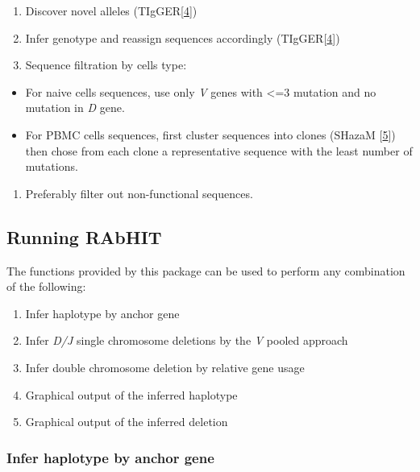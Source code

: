\documentclass[11pt,]{article}
\providecommand{\tightlist}{%
  \setlength{\itemsep}{0pt}\setlength{\parskip}{0pt}}
\begin{document}
\begin{enumerate}
\def\labelenumi{\arabic{enumi}.}
\tightlist
\item
  Discover novel alleles
  (TIgGER{[}\protect\hyperlink{ref-gadala2018identification}{4}{]})
\item
  Infer genotype and reassign sequences accordingly
  (TIgGER{[}\protect\hyperlink{ref-gadala2018identification}{4}{]})
\item
  Sequence filtration by cells type:
\end{enumerate}

\begin{itemize}
\tightlist
\item
  For naive cells sequences, use only \emph{V} genes with \textless{}=3
  mutation and no mutation in \emph{D} gene.
\item
  For PBMC cells sequences, first cluster sequences into clones (SHazaM
  {[}\protect\hyperlink{ref-gupta2015change}{5}{]}) then chose from each
  clone a representative sequence with the least number of mutations.
\end{itemize}

\begin{enumerate}
\def\labelenumi{\arabic{enumi}.}
\setcounter{enumi}{3}
\tightlist
\item
  Preferably filter out non-functional sequences.
\end{enumerate}

\subsection{Running RAbHIT}\label{running-rabhit}

The functions provided by this package can be used to perform any
combination of the following:

\begin{enumerate}
\def\labelenumi{\arabic{enumi}.}
\tightlist
\item
  Infer haplotype by anchor gene
\item
  Infer \emph{D/J} single chromosome deletions by the \emph{V} pooled
  approach
\item
  Infer double chromosome deletion by relative gene usage
\item
  Graphical output of the inferred haplotype
\item
  Graphical output of the inferred deletion
\end{enumerate}

\subsubsection{Infer haplotype by anchor
gene}\label{infer-haplotype-by-anchor-gene}
\end{document}
